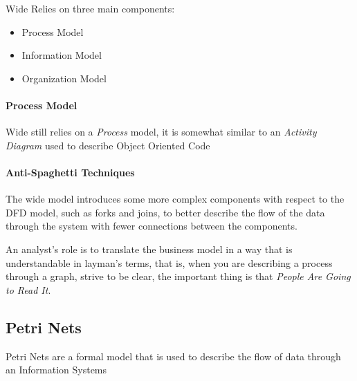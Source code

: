 \documentclass[openright, twoside, twocolumn]{report}
\begin{document}
    Wide Relies on three main components:

    \begin{itemize}
      \item Process Model
      \item Information Model
      \item Organization Model
    \end{itemize}
    
    \paragraph{Process Model}
    Wide still relies on a \emph{Process} model, it is somewhat similar to an \emph{Activity Diagram} used 
    to describe Object Oriented Code

    \paragraph{Anti-Spaghetti Techniques}
    
    The wide model introduces some more complex components with respect to the DFD model, such as forks and joins, 
    to better describe the flow of the data through the system with fewer connections between the components.
    
    \begin{remark}
      An analyst's role is to translate the business model in a way that is understandable in layman's terms,
      that is, when you are describing a process through a graph, strive to be clear, the important thing 
      is that \emph{People Are Going to Read It}.
    \end{remark}

    \subsection{Petri Nets}

    Petri Nets are a formal model that is used to describe the flow of data through an Information Systems
\end{document}
